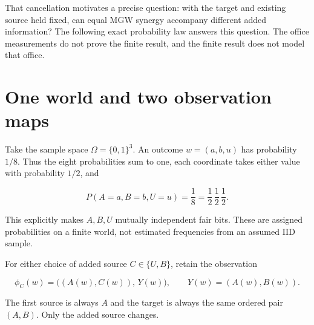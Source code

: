 That cancellation motivates a precise question: with the target and existing source held fixed, can equal MGW synergy accompany different added information? The following exact probability law answers this question. The office measurements do not prove the finite result, and the finite result does not model that office.

\par{}

\section{One world and two observation maps}\label{one-world-and-two-observation-maps}

Take the sample space \(\Omega=\{0,1\}^3\). An outcome \(w=(a,b,u)\) has probability \(1/8\). Thus the eight probabilities sum to one, each coordinate takes either value with probability \(1/2\), and

\[
P(A=a,B=b,U=u)=\frac18
=\frac12\,\frac12\,\frac12.
\]

This explicitly makes \(A,B,U\) mutually independent fair bits. These are assigned probabilities on a finite world, not estimated frequencies from an assumed IID sample.

For either choice of added source \(C\in\{U,B\}\), retain the observation

\[
\phi_C(w)=\bigl((A(w),C(w)),\,Y(w)\bigr),\qquad Y(w)=(A(w),B(w)).
\]

The first source is always \(A\) and the target is always the same ordered pair \((A,B)\). Only the added source changes.

